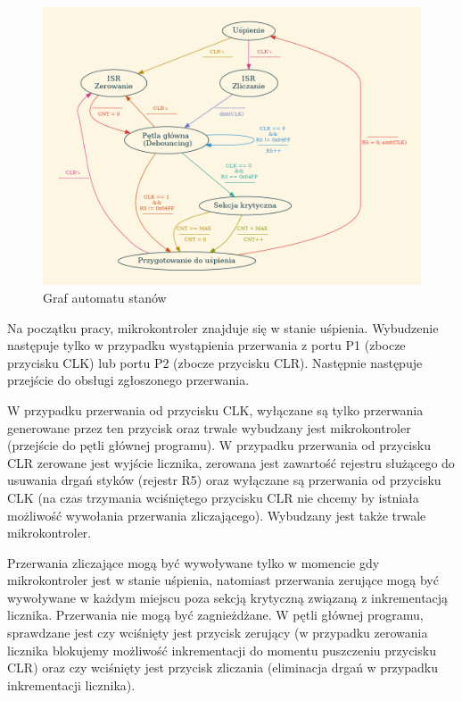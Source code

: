 \documentclass[fleqn]{article}
\begin{document}
\begin{figure}[H]
	\centering
	\includegraphics[width=\textwidth]{assets/graph.png}
	\caption{Graf automatu stanów}
	\label{fig:graph}
\end{figure}


Na początku pracy, mikrokontroler znajduje się w stanie uśpienia. Wybudzenie następuje tylko w przypadku wystąpienia przerwania z portu P1 (zbocze przycisku CLK) lub portu P2 (zbocze przycisku CLR). Następnie następuje przejście do obsługi zgłoszonego przerwania.

W przypadku przerwania od przycisku CLK, wyłączane są tylko przerwania generowane przez ten przycisk oraz trwale wybudzany jest mikrokontroler (przejście do pętli głównej programu). W przypadku przerwania od przycisku CLR zerowane jest wyjście licznika, zerowana jest zawartość rejestru służącego do usuwania drgań styków (rejestr R5) oraz wyłączane są przerwania od przycisku CLK (na czas trzymania wciśniętego przycisku CLR nie chcemy by istniała możliwość wywołania przerwania zliczającego). Wybudzany jest także trwale mikrokontroler.

Przerwania zliczające mogą być wywoływane tylko w momencie gdy mikrokontroler jest w stanie uśpienia, natomiast przerwania zerujące mogą być wywoływane w każdym miejscu poza sekcją krytyczną związaną z inkrementacją licznika. Przerwania nie mogą być zagnieżdżane. W pętli głównej programu, sprawdzane jest czy wciśnięty jest przycisk zerujący (w przypadku zerowania licznika blokujemy możliwość inkrementacji do momentu puszczeniu przycisku CLR) oraz czy wciśnięty jest przycisk zliczania (eliminacja drgań w przypadku inkrementacji licznika).
\end{document}
